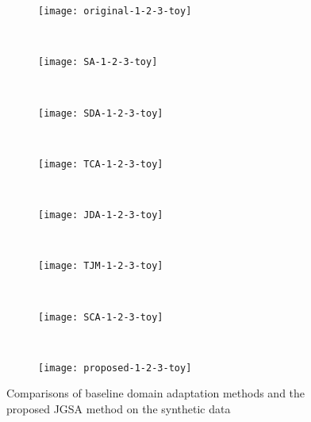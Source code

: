\documentclass[10pt,twocolumn,letterpaper]{article}
\begin{document}
\begin{figure*}[ht!]
    \centering
    \begin{subfigure}[t]{0.245\textwidth}
        \centering
        \texttt{[image: original-1-2-3-toy]}
\label{fig:DA1}
    \end{subfigure}~
	\begin{subfigure}[t]{0.235\textwidth}
        \centering
        \texttt{[image: SA-1-2-3-toy]}
\label{fig:DA2}
    \end{subfigure}
~
    \begin{subfigure}[t]{0.235\textwidth}
        \centering
        \texttt{[image: SDA-1-2-3-toy]}
\label{fig:DA3}
    \end{subfigure}
~
    \begin{subfigure}[t]{0.235\textwidth}
        \centering
        \texttt{[image: TCA-1-2-3-toy]}
\label{fig:DA4}
    \end{subfigure}\\
\vspace{-1em}
    \begin{subfigure}[t]{0.235\textwidth}
        \centering
        \texttt{[image: JDA-1-2-3-toy]}
\label{fig:DA5}
    \end{subfigure}
~
    \begin{subfigure}[t]{0.235\textwidth}
        \centering
        \texttt{[image: TJM-1-2-3-toy]}
\label{fig:DA6}
    \end{subfigure}
~
    \begin{subfigure}[t]{0.235\textwidth}
        \centering
        \texttt{[image: SCA-1-2-3-toy]}
\label{fig:DA7}
    \end{subfigure}
~
    \begin{subfigure}[t]{0.235\textwidth}
        \centering
        \texttt{[image: proposed-1-2-3-toy]}
\label{fig:DA8}
    \end{subfigure}
\caption{Comparisons of baseline domain adaptation methods and the proposed JGSA method on the synthetic data }
\label{fig:toy}
\end{figure*}
\end{document}
